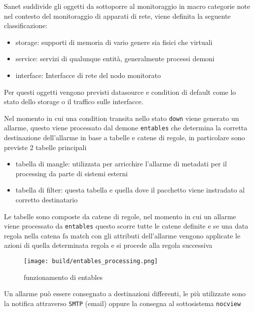 \documentclass[12pt,a4paper,twoside,openright]{book}
\begin{document}
Sanet suddivide gli oggetti da sottoporre al monitoraggio in macro categorie note nel contesto del monitoraggio di apparati di rete, viene definita la seguente classificazione:

\begin{itemize}
  \item storage: supporti di memoria di vario genere sia fisici che virtuali
  \item service: servizi di qualunque entità, generalmente processi demoni
  \item interface: Interfacce di rete del nodo monitorato
\end{itemize}

Per questi oggetti vengono previsti datasource e condition di default come lo stato dello storage o il traffico sulle interfacce.

Nel momento in cui una condition transita nello stato \verb|down| viene generato un allarme, questo viene processato dal demone \verb|entables| che determina la corretta destinazione dell'allarme in base a tabelle e catene di regole, in particolare sono previste 2 tabelle principali

\begin{itemize}
  \item tabella di mangle: utilizzata per arricchire l'allarme di metadati per il processing da parte di sistemi esterni
  \item tabella di filter: questa tabella e quella dove il pacchetto viene instradato al corretto destinatario
\end{itemize}

Le tabelle sono composte da catene di regole, nel momento in cui un allarme viene processato da \verb|entables| questo scorre tutte le catene definite e se una data regola nella catena fa match con gli attributi dell'allarme vengono applicate le azioni di quella determinata regola e si procede alla regola successiva

\begin{figure}[H]
    \centering
    \texttt{[image: build/entables\_processing.png]}
    \caption{funzionamento di entables}
    \label{fig:enter-label}
\end{figure}

Un allarme può essere consegnato a destinazioni differenti, le più utilizzate sono la notifica attraverso \verb|SMTP| (email) oppure la consegna al sottosistema \verb|nocview|
\end{document}
